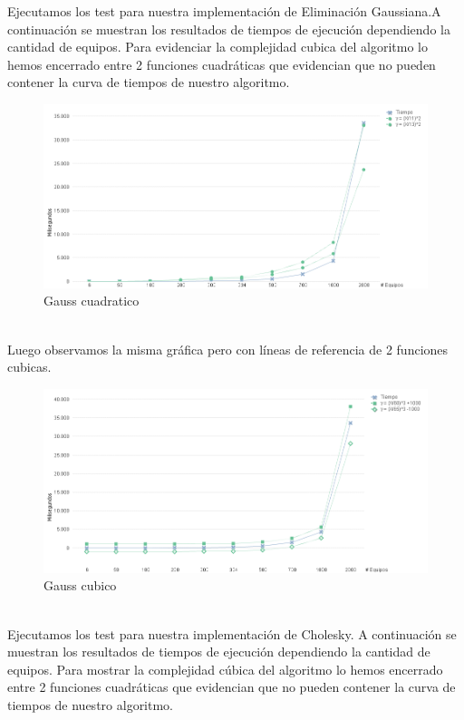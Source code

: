Ejecutamos los test para nuestra implementación de Eliminación Gaussiana.A continuación se muestran los resultados de tiempos de ejecución dependiendo la cantidad de equipos.
Para evidenciar la complejidad cubica del algoritmo lo hemos encerrado entre 2 funciones cuadráticas que evidencian que no pueden contener la curva de tiempos de nuestro algoritmo. \\

\begin{figure}[H]
\centering
\includegraphics[width=1\textwidth]{IMG/gauss cuadrativo.png}
\caption{Gauss cuadratico}
\label{fig:Gauss cuadratico}
\end{figure}

\\

Luego observamos la misma gráfica pero con líneas de referencia de 2 funciones cubicas. \\

\begin{figure}[H]
\centering
\includegraphics[width=1\textwidth]{IMG/gauss cubico.png}
\caption{Gauss cubico}
\label{fig:Gauss cubico}
\end{figure}

\\
Ejecutamos los test para nuestra implementación de Cholesky. A continuación se muestran los resultados de tiempos de ejecución dependiendo la cantidad de equipos.
Para mostrar la complejidad cúbica del algoritmo lo hemos encerrado entre 2 funciones cuadráticas que evidencian que no pueden contener la curva de tiempos de nuestro algoritmo.\\


